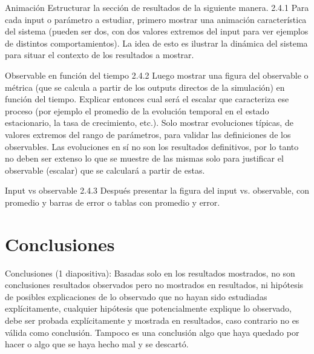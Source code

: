 \documentclass{beamer}
\begin{document}
    \begin{frame}{Animación}
        Estructurar la sección de resultados de la siguiente manera.
        2.4.1 Para cada input o parámetro a estudiar, primero mostrar una animación característica del
        sistema (pueden ser dos, con dos valores extremos del input para ver ejemplos de distintos
        comportamientos). La idea de esto es ilustrar la dinámica del sistema para situar el contexto de los
        resultados a mostrar.
    \end{frame}

    \begin{frame}{Observable en función del tiempo}
        2.4.2 Luego mostrar una figura del observable o métrica (que se calcula a partir de los outputs
        directos de la simulación) en función del tiempo. Explicar entonces cual será el escalar que
        caracteriza ese proceso (por ejemplo el promedio de la evolución temporal en el estado
        estacionario, la tasa de crecimiento, etc.). Solo mostrar evoluciones típicas, de valores extremos
        del rango de parámetros, para validar las definiciones de los observables. Las evoluciones en sí
        no son los resultados definitivos, por lo tanto no deben ser extenso lo que se muestre de las
        mismas solo para justificar el observable (escalar) que se calculará a partir de estas.
    \end{frame}

    \begin{frame}{Input vs observable}
        2.4.3 Después presentar la figura del input vs. observable, con promedio y barras de error o tablas
        con promedio y error.
    \end{frame}


    \section{Conclusiones}

    \begin{frame}{Conclusiones}
        (1 diapositiva): Basadas solo en los resultados mostrados, no son conclusiones
        resultados observados pero no mostrados en resultados, ni hipótesis de posibles explicaciones de
        lo observado que no hayan sido estudiadas explícitamente, cualquier hipótesis que
        potencialmente explique lo observado, debe ser probada explícitamente y mostrada en resultados,
        caso contrario no es válida como conclusión. Tampoco es una conclusión algo que haya quedado
        por hacer o algo que se haya hecho mal y se descartó.
    \end{frame}
\end{document}

